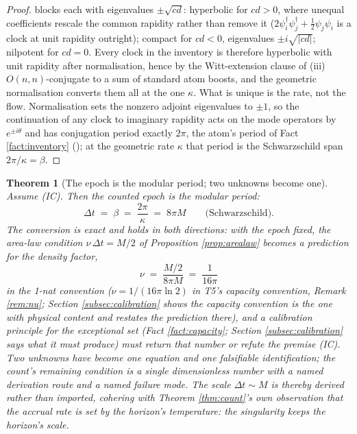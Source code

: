 \documentclass[11pt]{article}
\newtheorem{theorem}{Theorem}[section]
\theoremstyle{definition}
\begin{document}
\begin{proof}
blocks each with eigenvalues $\pm\sqrt{cd}$: hyperbolic for $cd > 0$, where unequal coefficients rescale the common rapidity rather than remove it ($2\psi_i^\dagger\psi_j^\dagger + \tfrac12\psi_j\psi_i$ is a clock at unit rapidity outright); compact for $cd < 0$, eigenvalues $\pm i\sqrt{|cd|}$; nilpotent for $cd = 0$. Every clock in the inventory is therefore hyperbolic with unit rapidity after normalisation, hence by the Witt-extension clause of (iii) $O(n,n)$-conjugate to a sum of standard atom boosts, and the geometric normalisation converts them all at the one $\kappa$. What is unique is the rate, not the flow. Normalisation sets the nonzero adjoint eigenvalues to $\pm 1$, so the continuation of any clock to imaginary rapidity acts on the mode operators by $e^{\pm i\theta}$ and has conjugation period exactly $2\pi$, the atom's period of Fact \ref{fact:inventory} (\cite[Prop.~7.21(1)]{ButlerT5}); at the geometric rate $\kappa$ that period is the Schwarzschild span $2\pi/\kappa = \beta$.
\end{proof}

\begin{theorem}[The epoch is the modular period; two unknowns become one]\label{thm:epoch}
Assume (IC). Then the counted epoch is the modular period:
\[
\Delta t \;=\; \beta \;=\; \frac{2\pi}{\kappa} \;=\; 8\pi M \qquad \text{(Schwarzschild)}.
\]
The conversion is exact and holds in both directions: with the epoch fixed, the area-law condition $\nu\,\Delta t = M/2$ of Proposition \ref{prop:arealaw} becomes a prediction for the density factor,
\[
\nu \;=\; \frac{M/2}{8\pi M} \;=\; \frac{1}{16\pi}
\]
in the 1-nat convention ($\nu = 1/(16\pi\ln 2)$ in T5's capacity convention, Remark \ref{rem:nu}; Section \ref{subsec:calibration} shows the capacity convention is the one with physical content and restates the prediction there), and a calibration principle for the exceptional set (Fact \ref{fact:capacity}; Section \ref{subsec:calibration} says what it must produce) must return that number \emph{or refute the premise (IC)}. Two unknowns have become one equation and one falsifiable identification; the count's remaining condition is a single dimensionless number with a named derivation route and a named failure mode. The scale $\Delta t \sim M$ is thereby derived rather than imported, cohering with Theorem \ref{thm:count}'s own observation that the accrual rate is set by the horizon's temperature: the singularity keeps the horizon's scale.
\end{theorem}
\end{document}
